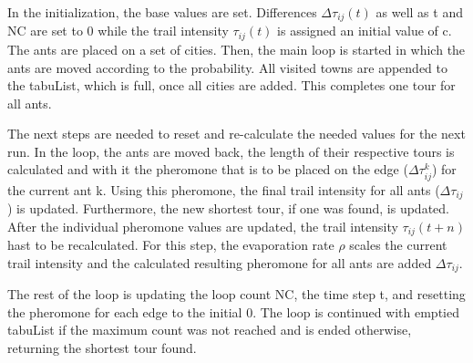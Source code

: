 In the initialization, the base values are set.
Differences $\Delta\tau_{ij}(t)$ as well as t and NC are set to 0 while the trail intensity $\tau_{ij}(t)$ is assigned an initial value of c.
The ants are placed on a set of cities.
Then, the main loop is started in which the ants are moved according to the probability.
All visited towns are appended to the tabuList, which is full, once all cities are added.
This completes one tour for all ants.

The next steps are needed to reset and re-calculate the needed values for the next run.
In the loop, the ants are moved back, the length of their respective tours is calculated and with it the pheromone that is to be placed on the edge ($\Delta\tau_{ij}^k$) for the current ant k.
Using this pheromone, the final trail intensity for all ants ($\Delta\tau_{ij}$) is updated.
Furthermore, the new shortest tour, if one was found, is updated.
After the individual pheromone values are updated, the trail intensity $\tau_{ij}(t+n)$ hast to be recalculated. 
For this step, the evaporation rate $\rho$ scales the current trail intensity and the calculated resulting pheromone for all ants are added $\Delta\tau_{ij}$.

The rest of the loop is updating the loop count NC, the time step t, and resetting the pheromone for each edge to the initial 0.
The loop is continued with emptied tabuList if the maximum count was not reached and is ended otherwise, returning the shortest tour found.


